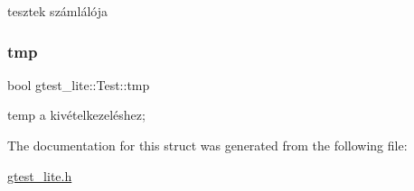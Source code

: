 tesztek számlálója 

\mbox{\label{structgtest__lite_1_1_test_a1145ceb335a60a808b7b4d5d1624b2a5}} 
\subsubsection{\texorpdfstring{tmp}{tmp}}
{\footnotesize\ttfamily bool gtest\+\_\+lite\+::\+Test\+::tmp}



temp a kivételkezeléshez; 



The documentation for this struct was generated from the following file\+:\begin{DoxyCompactItemize}
\item 
\hyperlink{gtest__lite_8h}{gtest\+\_\+lite.\+h}\end{DoxyCompactItemize}
